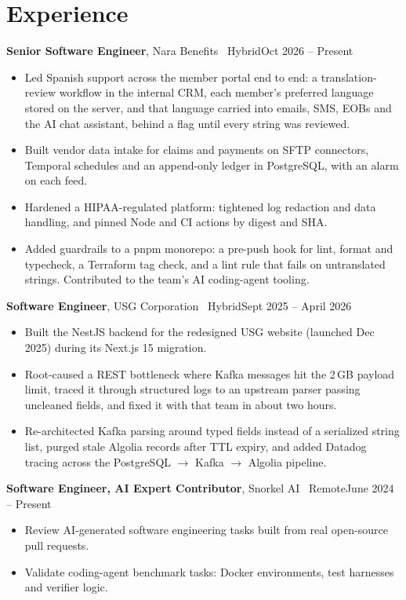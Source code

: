 \documentclass[10pt,letterpaper]{article}
\newcommand{\role}[4]{%
  \textbf{#1}, #2 \textcolor{muted}{\textperiodcentered\ #3}\hfill\textcolor{muted}{#4}\par}
\newcommand{\gap}{\vspace{3pt}}
\begin{document}
\section{Experience}
\role{Senior Software Engineer}{Nara Benefits}{Hybrid}{Oct 2026 -- Present}
\begin{itemize}
  \item Led Spanish support across the member portal end to end: a translation-review workflow in the
        internal CRM, each member's preferred language stored on the server, and that language carried
        into emails, SMS, EOBs and the AI chat assistant, behind a flag until every string was reviewed.
  \item Built vendor data intake for claims and payments on SFTP connectors, Temporal schedules and an
        append-only ledger in PostgreSQL, with an alarm on each feed.
  \item Hardened a HIPAA-regulated platform: tightened log redaction and data handling, and pinned Node
        and CI actions by digest and SHA.
  \item Added guardrails to a pnpm monorepo: a pre-push hook for lint, format and typecheck, a Terraform
        tag check, and a lint rule that fails on untranslated strings. Contributed to the team's AI
        coding-agent tooling.
\end{itemize}
\gap
\role{Software Engineer}{USG Corporation}{Hybrid}{Sept 2025 -- April 2026}
\begin{itemize}
  \item Built the NestJS backend for the redesigned USG website (launched Dec 2025) during
        its Next.js 15 migration.
  \item Root-caused a REST bottleneck where Kafka messages hit the 2\,GB payload limit, traced it through
        structured logs to an upstream parser passing uncleaned fields, and fixed it with that team in
        about two hours.
  \item Re-architected Kafka parsing around typed fields instead of a serialized string list, purged
        stale Algolia records after TTL expiry, and added Datadog tracing across the
        PostgreSQL $\rightarrow$ Kafka $\rightarrow$ Algolia pipeline.
\end{itemize}
\gap
\role{Software Engineer, AI Expert Contributor}{Snorkel AI}{Remote}{June 2024 -- Present}
\begin{itemize}
  \item Review AI-generated software engineering tasks built from real open-source pull requests.
  \item Validate coding-agent benchmark tasks: Docker environments, test harnesses and verifier logic.
\end{itemize}
\end{document}
